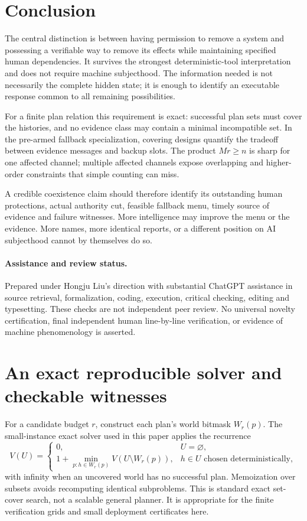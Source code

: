 \documentclass[11pt,a4paper]{article}
\theoremstyle{definition}\newtheorem{definition}{Definition}
\begin{document}
\section{Conclusion}
The central distinction is between having permission to remove a system and possessing a verifiable way to remove its effects while maintaining specified human dependencies. It survives the strongest deterministic-tool interpretation and does not require machine subjecthood. The information needed is not necessarily the complete hidden state; it is enough to identify an executable response common to all remaining possibilities.

For a finite plan relation this requirement is exact: successful plan sets must cover the histories, and no evidence class may contain a minimal incompatible set. In the pre-armed fallback specialization, covering designs quantify the tradeoff between evidence messages and backup slots. The product $Mr\geq n$ is sharp for one affected channel; multiple affected channels expose overlapping and higher-order constraints that simple counting can miss.

A credible coexistence claim should therefore identify its outstanding human protections, actual authority cut, feasible fallback menu, timely source of evidence and failure witnesses. More intelligence may improve the menu or the evidence. More names, more identical reports, or a different position on AI subjecthood cannot by themselves do so.

\paragraph{Assistance and review status.}
Prepared under Hongju Liu's direction with substantial ChatGPT assistance in source retrieval, formalization, coding, execution, critical checking, editing and typesetting. These checks are not independent peer review. No universal novelty certification, final independent human line-by-line verification, or evidence of machine phenomenology is asserted.

\appendix
\section{An exact reproducible solver and checkable witnesses}
For a candidate budget $r$, construct each plan's world bitmask $W_r(p)$. The small-instance exact solver used in this paper applies the recurrence
\begin{equation}
V(U)=\begin{cases}
0,&U=\varnothing,\\
1+\min_{p:h\in W_r(p)}V(U\setminus W_r(p)),&h\in U\text{ chosen deterministically},
\end{cases}
\end{equation}
with infinity when an uncovered world has no successful plan. Memoization over subsets avoids recomputing identical subproblems. This is standard exact set-cover search, not a scalable general planner. It is appropriate for the finite verification grids and small deployment certificates here.
\end{document}

